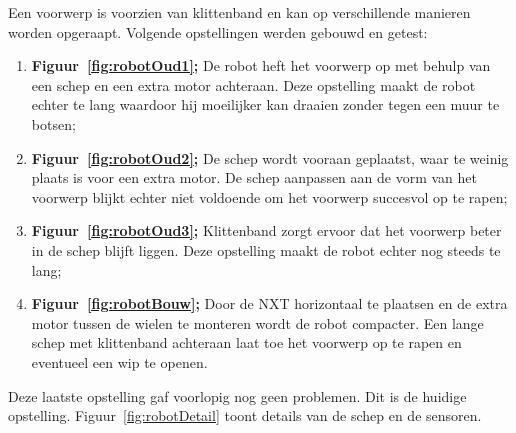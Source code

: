 \documentclass[eind]{penoverslag}
\begin{document}
Een voorwerp is voorzien van klittenband en kan op verschillende manieren worden opgeraapt. Volgende opstellingen werden gebouwd en getest:
\begin{enumerate}
\item \textbf{Figuur~\ref{fig:robotOud1};} De robot heft het voorwerp op met behulp van een schep en een extra motor achteraan. Deze opstelling maakt de robot echter te lang waardoor hij moeilijker kan draaien zonder tegen een muur te botsen;
\item \textbf{Figuur~\ref{fig:robotOud2};} De schep wordt vooraan geplaatst, waar te weinig plaats is voor een extra motor. De schep aanpassen aan de vorm van het voorwerp blijkt echter niet voldoende om het voorwerp succesvol op te rapen;
\item \textbf{Figuur~\ref{fig:robotOud3};} Klittenband zorgt ervoor dat het voorwerp beter in de schep blijft liggen. Deze opstelling maakt de robot echter nog steeds te lang;
\item \textbf{Figuur~\ref{fig:robotBouw};} Door de \textsc{NXT} horizontaal te plaatsen en de extra motor tussen de wielen te monteren wordt de robot compacter. Een lange schep met klittenband achteraan laat toe het voorwerp op te rapen en eventueel een wip te openen.
\end{enumerate}

Deze laatste opstelling gaf voorlopig nog geen problemen. Dit is de huidige opstelling. Figuur~\ref{fig:robotDetail} toont details van de schep en de sensoren.
\end{document}
